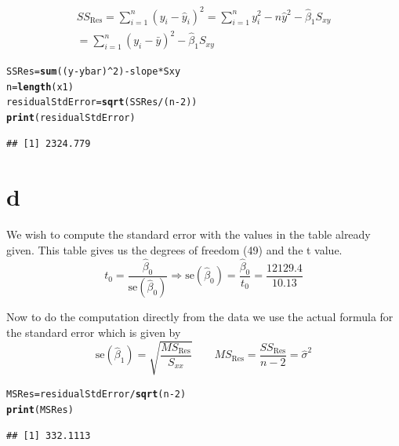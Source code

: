 \documentclass{article}\usepackage[]{graphicx}\usepackage[]{color}
\makeatletter
\newcommand{\hlnum}[1]{\textcolor[rgb]{0.686,0.059,0.569}{#1}}%
\newcommand{\hlopt}[1]{\textcolor[rgb]{0,0,0}{#1}}%
\newcommand{\hlstd}[1]{\textcolor[rgb]{0.345,0.345,0.345}{#1}}%
\newcommand{\hlkwb}[1]{\textcolor[rgb]{0.69,0.353,0.396}{#1}}%
\newcommand{\hlkwd}[1]{\textcolor[rgb]{0.737,0.353,0.396}{\textbf{#1}}}%
\newenvironment{kframe}{%
 \def\at@end@of@kframe{}%
 \ifinner\ifhmode%
  \def\at@end@of@kframe{\end{minipage}}%
  \begin{minipage}{\columnwidth}%
 \fi\fi%
 \def\FrameCommand##1{\hskip\@totalleftmargin \hskip-\fboxsep
 \colorbox{shadecolor}{##1}\hskip-\fboxsep
     \hskip-\linewidth \hskip-\@totalleftmargin \hskip\columnwidth}%
 \MakeFramed {\advance\hsize-\width
   \@totalleftmargin\z@ \linewidth\hsize
   \@setminipage}}%
 {\par\unskip\endMakeFramed%
 \at@end@of@kframe}
\newenvironment{knitrout}{}{} %
\makeatother
\begin{document}
\begin{align}
SS_{\mathrm{Res}} = \sum_{i=1}^{n}(y_i - \hat y_i)^2 = \sum_{i=1}^{n}y_i^2 - n\hat y ^2 - \hat\beta_1 S_{xy}\\
= \sum_{i=1}^{n} (y_i - \bar y)^2  - \hat\beta_1 S_{xy}
\end{align}

\begin{knitrout}
\color{fgcolor}\begin{kframe}
\begin{alltt}
\hlstd{SSRes} \hlkwb{=} \hlkwd{sum}\hlstd{((y} \hlopt{-} \hlstd{ybar)}\hlopt{^}\hlnum{2}\hlstd{)} \hlopt{-} \hlstd{slope}\hlopt{*}\hlstd{Sxy}
\hlstd{n} \hlkwb{=} \hlkwd{length}\hlstd{(x1)}
\hlstd{residualStdError} \hlkwb{=} \hlkwd{sqrt}\hlstd{(SSRes}\hlopt{/}\hlstd{(n}\hlopt{-}\hlnum{2}\hlstd{))}
\hlkwd{print}\hlstd{(residualStdError)}
\end{alltt}
\begin{verbatim}
## [1] 2324.779
\end{verbatim}
\end{kframe}
\end{knitrout}

\section*{d}

We wish to compute the standard error with the values in the table already given. This table gives us the degrees of freedom (49) and the t value. 
\begin{equation} t_0 = \frac{\hat\beta_0}{\mathrm{se}(\hat\beta_0)} \Rightarrow 
\mathrm{se}(\hat\beta_0) = \frac{\hat\beta_0}{t_0} = \frac{12129.4}{10.13}  \end{equation}

Now to do the computation directly from the data we use the actual formula for the standard error which is given by
\begin{equation} \mathrm{se}(\hat\beta_1) = \sqrt{\frac{MS_{\mathrm{Res}}}{S_{xx}}} \qquad MS_{\mathrm{Res}} = \frac{SS_\mathrm{Res}}{n-2} = \hat\sigma^2 \end{equation}

\begin{knitrout}
\color{fgcolor}\begin{kframe}
\begin{alltt}
\hlstd{MSRes} \hlkwb{=} \hlstd{residualStdError} \hlopt{/} \hlkwd{sqrt}\hlstd{(n}\hlopt{-}\hlnum{2}\hlstd{)}
\hlkwd{print}\hlstd{(MSRes)}
\end{alltt}
\begin{verbatim}
## [1] 332.1113
\end{verbatim}
\end{kframe}
\end{knitrout}
\end{document}
